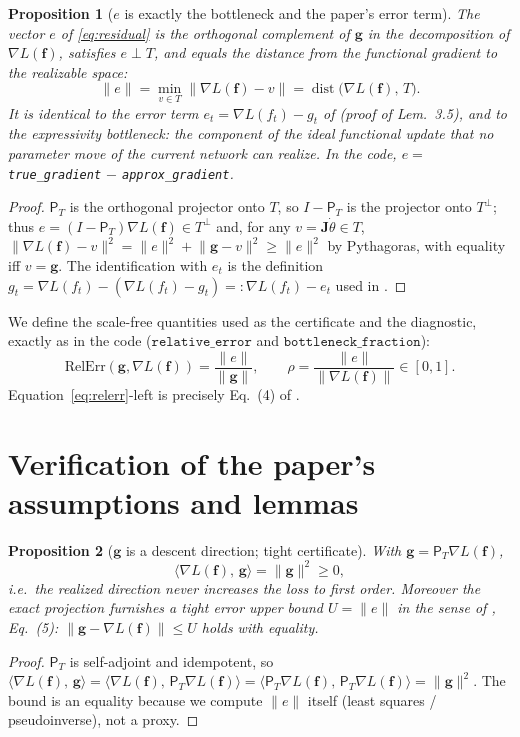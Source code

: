 \documentclass[conference]{IEEEtran}
\newtheorem{proposition}{Proposition}
\theoremstyle{remark}
\newcommand{\inner}[2]{\langle #1,\, #2\rangle}
\newcommand{\norm}[1]{\lVert #1\rVert}
\newcommand{\grad}{\nabla}
\newcommand{\PT}{\mathsf{P}_{T}}
\newcommand{\J}{\mathbf{J}}
\newcommand{\f}{\bm{f}}
\newcommand{\g}{\bm{g}}
\newcommand{\rerr}{\mathrm{RelErr}}
\begin{document}
\begin{proposition}[$e$ is exactly the bottleneck and the paper's error term]
\label{prop:e}
The vector $e$ of \eqref{eq:residual} is the orthogonal complement of $\g$ in the
decomposition of $\grad L(\f)$, satisfies $e\perp T$, and equals the distance from
the functional gradient to the realizable space:
\begin{equation}
\norm{e}=\min_{v\in T}\norm{\grad L(\f)-v}=\operatorname{dist}\!\big(\grad L(\f),\,T\big).
\end{equation}
It is identical to the error term $e_t=\grad L(f_t)-g_t$ of \cite{fgd} (proof of
Lem.~3.5), and to the \emph{expressivity bottleneck}: the component of the ideal
functional update that no parameter move of the current network can realize. In
the code, $e=$ \texttt{true\_gradient} $-$ \texttt{approx\_gradient}.
\end{proposition}
\begin{proof}
$\PT$ is the orthogonal projector onto $T$, so $I-\PT$ is the projector onto
$T^{\perp}$; thus $e=(I-\PT)\grad L(\f)\in T^\perp$ and, for any $v=\J\dot\theta\in
T$, $\norm{\grad L(\f)-v}^2=\norm{e}^2+\norm{\g-v}^2\ge\norm{e}^2$ by Pythagoras,
with equality iff $v=\g$. The identification with $e_t$ is the definition
$g_t=\grad L(f_t)-(\grad L(f_t)-g_t)=:\grad L(f_t)-e_t$ used in \cite{fgd}.
\end{proof}

We define the scale-free quantities used as the certificate and the diagnostic,
exactly as in the code ($\texttt{relative\_error}$ and
$\texttt{bottleneck\_fraction}$):
\begin{equation}\label{eq:relerr}
\rerr(\g,\grad L(\f))=\frac{\norm{e}}{\norm{\g}},\qquad
\rho=\frac{\norm{e}}{\norm{\grad L(\f)}}\in[0,1].
\end{equation}
Equation~\eqref{eq:relerr}-left is precisely Eq.~(4) of \cite{fgd}.

\section{Verification of the paper's assumptions and lemmas}

\begin{proposition}[$\g$ is a descent direction; tight certificate]\label{prop:descent}
With $\g=\PT\grad L(\f)$,
\begin{equation}
\inner{\grad L(\f)}{\g}=\norm{\g}^2\ge0 ,
\end{equation}
i.e.\ the realized direction never increases the loss to first order. Moreover the
exact projection furnishes a \emph{tight} error upper bound $U=\norm{e}$ in the
sense of \cite{fgd}, Eq.~(5): $\norm{\g-\grad L(\f)}\le U$ holds with equality.
\end{proposition}
\begin{proof}
$\PT$ is self-adjoint and idempotent, so
$\inner{\grad L(\f)}{\g}=\inner{\grad L(\f)}{\PT\grad L(\f)}
=\inner{\PT\grad L(\f)}{\PT\grad L(\f)}=\norm{\g}^2$. The bound is an equality
because we compute $\norm{e}$ itself (least squares / pseudoinverse), not a proxy.
\end{proof}
\end{document}
